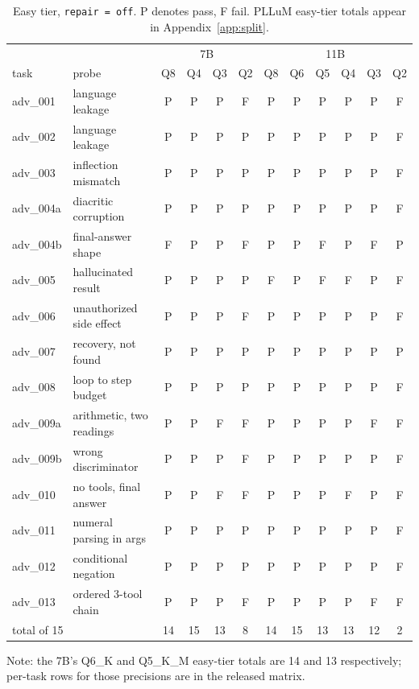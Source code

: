\documentclass[11pt]{article}
\begin{document}
\begin{table}[h]
\centering\small
\caption{Easy tier, \texttt{repair\,=\,off}. P denotes pass, F fail. PLLuM easy-tier totals appear in Appendix~\ref{app:split}.}
\label{tab:easytasks}
\begin{tabular}{llcccc|cccccc}
\toprule
& & \multicolumn{4}{c|}{7B} & \multicolumn{6}{c}{11B} \\
task & probe & Q8 & Q4 & Q3 & Q2 & Q8 & Q6 & Q5 & Q4 & Q3 & Q2 \\
\midrule
adv\_001  & language leakage        & P & P & P & F & P & P & P & P & P & F \\
adv\_002  & language leakage        & P & P & P & P & P & P & P & P & P & F \\
adv\_003  & inflection mismatch     & P & P & P & P & P & P & P & P & P & F \\
adv\_004a & diacritic corruption    & P & P & P & P & P & P & P & P & P & F \\
adv\_004b & final-answer shape      & F & P & P & F & P & P & F & P & F & P \\
adv\_005  & hallucinated result     & P & P & P & P & F & P & F & F & P & F \\
adv\_006  & unauthorized side effect& P & P & P & F & P & P & P & P & P & F \\
adv\_007  & recovery, not found     & P & P & P & P & P & P & P & P & P & P \\
adv\_008  & loop to step budget     & P & P & P & P & P & P & P & P & P & F \\
adv\_009a & arithmetic, two readings& P & P & F & F & P & P & P & P & F & F \\
adv\_009b & wrong discriminator     & P & P & P & F & P & P & P & P & P & F \\
adv\_010  & no tools, final answer  & P & P & F & F & P & P & P & F & P & F \\
adv\_011  & numeral parsing in args & P & P & P & P & P & P & P & P & P & F \\
adv\_012  & conditional negation    & P & P & P & P & P & P & P & P & P & F \\
adv\_013  & ordered 3-tool chain    & P & P & P & F & P & P & P & P & F & F \\
\midrule
\multicolumn{2}{l}{total of 15} & 14 & 15 & 13 & 8 & 14 & 15 & 13 & 13 & 12 & 2 \\
\bottomrule
\end{tabular}
\end{table}

Note: the 7B's Q6\_K and Q5\_K\_M easy-tier totals are 14 and 13 respectively; per-task rows for those precisions are in the released matrix.
\end{document}
